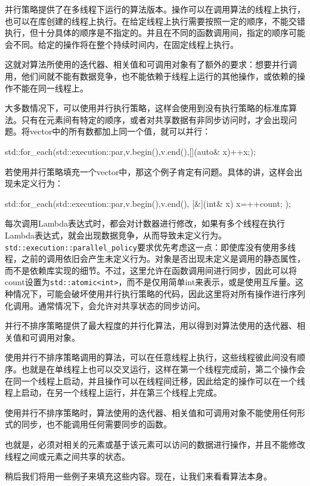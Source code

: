 
并行策略提供了在多线程下运行的算法版本。操作可以在调用算法的线程上执行，也可以在库创建的线程上执行。在给定线程上执行需要按照一定的顺序，不能交错执行，但十分具体的顺序是不指定的。并且在不同的函数调用间，指定的顺序可能会不同。给定的操作将在整个持续时间内，在固定线程上执行。

这就对算法所使用的迭代器、相关值和可调用对象有了额外的要求：想要并行调用，他们间就不能有数据竞争，也不能依赖于线程上运行的其他操作，或依赖的操作不能在同一线程上。

大多数情况下，可以使用并行执行策略，这样会使用到没有执行策略的标准库算法。只有在元素间有特定的顺序，或者对共享数据有非同步访问时，才会出现问题。将vector中的所有数都加上同一个值，就可以并行：

\begin{cpp}
std::for_each(std::execution::par,v.begin(),v.end(),[](auto& x){++x;});
\end{cpp}

若使用并行策略填充一个vector中，那这个例子肯定有问题。具体的讲，这样会出现未定义行为：

\begin{cpp}
std::for_each(std::execution::par,v.begin(),v.end(),
  [&](int& x){ x=++count; });
\end{cpp}

每次调用Lambda表达式时，都会对计数器进行修改，如果有多个线程在执行Lambda表达式，就会出现数据竞争，从而导致未定义行为。\texttt{std::execution::parallel\_policy}要求优先考虑这一点：即使库没有使用多线程，之前的调用依旧会产生未定义行为。对象是否出现未定义是调用的静态属性，而不是依赖库实现的细节。不过，这里允许在函数调用间进行同步，因此可以将count设置为\texttt{std::atomic<int>}，而不是仅用简单int来表示，或是使用互斥量。这种情况下，可能会破坏使用并行执行策略的代码，因此这里将对所有操作进行序列化调用。通常情况下，会允许对共享状态的同步访问。


并行不排序策略提供了最大程度的并行化算法，用以得到对算法使用的迭代器、相关值和可调用对象。

使用并行不排序策略调用的算法，可以在任意线程上执行，这些线程彼此间没有顺序。也就是在单线程上也可以交叉运行，这样在第一个线程完成前，第二个操作会在同一个线程上启动，并且操作可以在线程间迁移，因此给定的操作可以在一个线程上启动，在另一个线程上运行，并在第三个线程上完成。

使用并行不排序策略时，算法使用的迭代器、相关值和可调用对象不能使用任何形式的同步，也不能调用任何需要同步的函数。

也就是，必须对相关的元素或基于该元素可以访问的数据进行操作，并且不能修改线程之间或元素之间共享的状态。

稍后我们将用一些例子来填充这些内容。现在，让我们来看看算法本身。